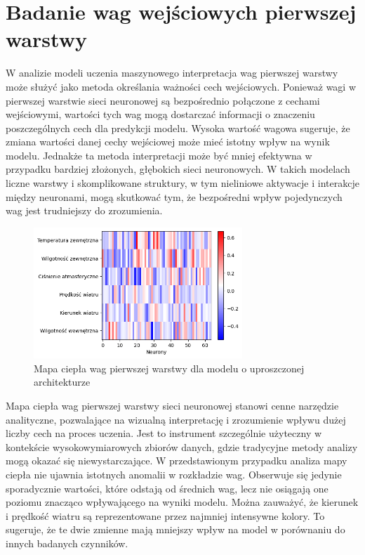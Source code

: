 \documentclass[a4paper,twoside,12pt]{book}
\begin{document}
\section{Badanie wag wejściowych pierwszej warstwy}
W analizie modeli uczenia maszynowego interpretacja wag pierwszej warstwy może służyć jako metoda określania ważności cech wejściowych. Ponieważ wagi w pierwszej warstwie sieci neuronowej są bezpośrednio połączone z cechami wejściowymi, wartości tych wag mogą dostarczać informacji o znaczeniu poszczególnych cech dla predykcji modelu. Wysoka wartość wagowa sugeruje, że zmiana wartości danej cechy wejściowej może mieć istotny wpływ na wynik modelu. Jednakże ta metoda interpretacji może być mniej efektywna w przypadku bardziej złożonych, głębokich sieci neuronowych. W takich modelach liczne warstwy i skomplikowane struktury, w tym nieliniowe aktywacje i interakcje między neuronami, mogą skutkować tym, że bezpośredni wpływ pojedynczych wag jest trudniejszy do zrozumienia.
\begin{figure}[!h]
  \centering
  \includegraphics[width=0.7\textwidth]{img/heatmap1.png}
  \caption{Mapa ciepła wag pierwszej warstwy dla modelu o uproszczonej architekturze}
  \label{fig:etykieta-rysunku}
\end{figure}

Mapa ciepła wag pierwszej warstwy sieci neuronowej stanowi cenne narzędzie analityczne, pozwalające na wizualną interpretację i zrozumienie wpływu dużej liczby cech na proces uczenia. Jest to instrument szczególnie użyteczny w kontekście wysokowymiarowych zbiorów danych, gdzie tradycyjne metody analizy mogą okazać się niewystarczające. W przedstawionym przypadku analiza mapy ciepła nie ujawnia istotnych anomalii w rozkładzie wag. Obserwuje się jedynie sporadycznie wartości, które odstają od średnich wag, lecz nie osiągają one poziomu znacząco wpływającego na wyniki modelu. Można zauważyć, że kierunek i prędkość wiatru są reprezentowane przez najmniej intensywne kolory. To sugeruje, że te dwie zmienne mają mniejszy wpływ na model w porównaniu do innych badanych czynników.
\end{document}
